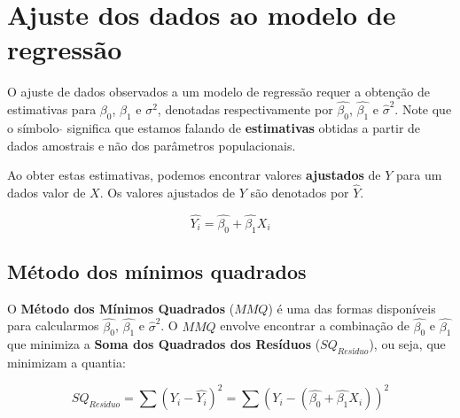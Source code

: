 \documentclass[
]{book}
\begin{document}
\hypertarget{ajuste-dos-dados-ao-modelo-de-regressuxe3o}{%
\section{Ajuste dos dados ao modelo de regressão}\label{ajuste-dos-dados-ao-modelo-de-regressuxe3o}}

O ajuste de dados observados a um modelo de regressão requer a obtenção de estimativas para \(\beta_0\), \(\beta_1\) e \(\sigma^2\), denotadas respectivamente por \(\hat{\beta_0}\), \(\hat{\beta_1}\) e \(\hat{\sigma}^2\). Note que o símbolo \(\hat{}\) significa que estamos falando de \textbf{estimativas} obtidas a partir de dados amostrais e não dos parâmetros populacionais.

Ao obter estas estimativas, podemos encontrar valores \textbf{ajustados} de \(Y\) para um dados valor de \(X\). Os valores ajustados de \(Y\) são denotados por \(\hat{Y}\).

\[\hat{Y_i} = \hat{\beta_0} + \hat{\beta_1}X_i\]

\hypertarget{muxe9todo-dos-muxednimos-quadrados}{%
\subsection{Método dos mínimos quadrados}\label{muxe9todo-dos-muxednimos-quadrados}}

O \textbf{Método dos Mínimos Quadrados} (\(MMQ\)) é uma das formas disponíveis para calcularmos \(\hat{\beta_0}\), \(\hat{\beta_1}\) e \(\hat{\sigma}^2\). O \(MMQ\) envolve encontrar a combinação de \(\hat{\beta_0}\) e \(\hat{\beta_1}\) que minimiza a \textbf{Soma dos Quadrados dos Resíduos} (\(SQ_{Resíduo}\)), ou seja, que minimizam a quantia:

\[SQ_{Resíduo} = \sum{(Y_i-\hat{Y_ i})^2} = \sum{(Y_i-(\hat{\beta_0} + \hat{\beta_1}X_i))^2}\]
\end{document}
